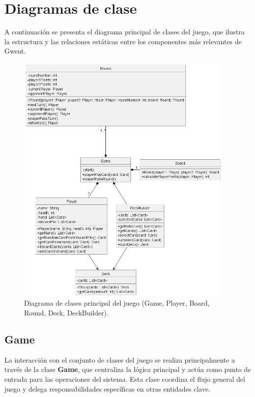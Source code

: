 \documentclass[titlepage,a4paper]{article}
\begin{document}
\section{Diagramas de clase}\label{sec:diagramasdeclase}

A continuación se presenta el diagrama principal de clases del juego, que ilustra la estructura y las relaciones estáticas entre los componentes más relevantes de Gwent.

\begin{figure}[H]
    \centering
    \includegraphics[width=0.95\textwidth]{../../../diagrams/classes/game.png}
    \caption{Diagrama de clases principal del juego (Game, Player, Board, Round, Deck, DeckBuilder).}
\end{figure}

\subsection*{Game}
La interacción con el conjunto de clases del juego se realiza principalmente a través de la clase \textbf{Game}, que centraliza la lógica principal y actúa como punto de entrada para las operaciones del sistema. Esta clase coordina el flujo general del juego y delega responsabilidades específicas en otras entidades clave.
\end{document}
